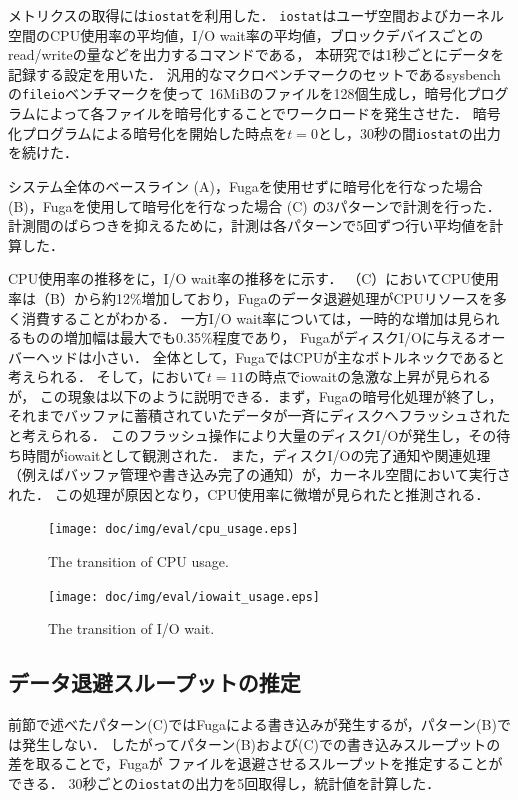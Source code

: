 メトリクスの取得には\texttt{iostat}を利用した．
\texttt{iostat}はユーザ空間およびカーネル空間のCPU使用率の平均値，I/O wait率の平均値，ブロックデバイスごとのread/writeの量などを出力するコマンドである，
本研究では1秒ごとにデータを記録する設定を用いた．
汎用的なマクロベンチマークのセットであるsysbench \cite{sysbench:online} の\texttt{fileio}ベンチマークを使って
16MiBのファイルを128個生成し，暗号化プログラムによって各ファイルを暗号化することでワークロードを発生させた．
暗号化プログラムによる暗号化を開始した時点を$t = 0$とし，30秒の間\texttt{iostat}の出力を続けた．

システム全体のベースライン (A)，Fugaを使用せずに暗号化を行なった場合 (B)，Fugaを使用して暗号化を行なった場合 (C) の3パターンで計測を行った．
計測間のばらつきを抑えるために，計測は各パターンで5回ずつ行い平均値を計算した．

CPU使用率の推移をに，I/O wait率の推移をに示す．
（C）においてCPU使用率は（B）から約12\%増加しており，Fugaのデータ退避処理がCPUリソースを多く消費することがわかる．
一方I/O wait率については，一時的な増加は見られるものの増加幅は最大でも0.35\%程度であり，
FugaがディスクI/Oに与えるオーバーヘッドは小さい．
全体として，FugaではCPUが主なボトルネックであると考えられる．
そして，において$t = 11$の時点でiowaitの急激な上昇が見られるが，
この現象は以下のように説明できる．まず，Fugaの暗号化処理が終了し，それまでバッファに蓄積されていたデータが一斉にディスクへフラッシュされたと考えられる．
このフラッシュ操作により大量のディスクI/Oが発生し，その待ち時間がiowaitとして観測された．
また，ディスクI/Oの完了通知や関連処理（例えばバッファ管理や書き込み完了の通知）が，カーネル空間において実行された．
この処理が原因となり，CPU使用率に微増が見られたと推測される．


\begin{figure}[tb]
  \centering
  \texttt{[image: doc/img/eval/cpu\_usage.eps]}
  \caption{The transition of CPU usage.}
  \label{fig:cpu-usage}
\end{figure}

\begin{figure}[tb]
  \centering
  \texttt{[image: doc/img/eval/iowait\_usage.eps]}
  \caption{The transition of I/O wait.}
  \label{fig:iowait}
\end{figure}

\subsection{データ退避スループットの推定}
前節で述べたパターン(C)ではFugaによる書き込みが発生するが，パターン(B)では発生しない．
したがってパターン(B)および(C)での書き込みスループットの差を取ることで，Fugaが
ファイルを退避させるスループットを推定することができる．
30秒ごとの\texttt{iostat}の出力を5回取得し，統計値を計算した．

